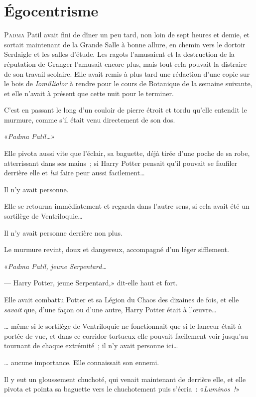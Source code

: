 \chapter{Égocentrisme}

\lettrine{P}{adma} Patil avait fini de dîner un peu tard, non loin de sept heures et demie, et sortait maintenant de la Grande Salle à bonne allure, en chemin vers le dortoir Serdaigle et les salles d'étude. Les ragots l'amusaient et la destruction de la réputation de Granger l'amusait encore plus, mais tout cela pouvait la distraire de son travail scolaire. Elle avait remis à plus tard une rédaction d'une copie sur le bois de \emph{Iomillialor} à rendre pour le cours de Botanique de la semaine suivante, et elle n'avait à présent que cette nuit pour le terminer.

C'est en passant le long d'un couloir de pierre étroit et tordu qu'elle entendit le murmure, comme s'il était venu directement de son dos.

«\emph{Padma Patil…}»

Elle pivota aussi vite que l'éclair, sa baguette, déjà tirée d'une poche de sa robe, atterrissant dans ses mains~; si Harry Potter pensait qu'il pouvait se faufiler derrière elle et \emph{lui} faire peur aussi facilement…

Il n'y avait personne.

Elle se retourna immédiatement et regarda dans l'autre sens, si cela avait été un sortilège de Ventriloquie…

Il n'y avait personne derrière non plus.

Le murmure revint, doux et dangereux, accompagné d'un léger sifflement.

«\emph{Padma Patil, jeune Serpentard…}

--- Harry Potter, jeune Serpentard,» dit-elle haut et fort.

Elle avait combattu Potter et sa Légion du Chaos des dizaines de fois, et elle \emph{savait} que, d'une façon ou d'une autre, Harry Potter était à l'œuvre…

… même si le sortilège de Ventriloquie ne fonctionnait que si le lanceur était à portée de vue, et dans ce corridor tortueux elle pouvait facilement voir jusqu'au tournant de chaque extrémité~; il n'y avait personne ici…

… aucune importance. Elle connaissait son ennemi.

Il y eut un gloussement chuchoté, qui venait maintenant de derrière elle, et elle pivota et pointa sa baguette vers le chuchotement puis s'écria~: «\emph{Luminos~!}»

